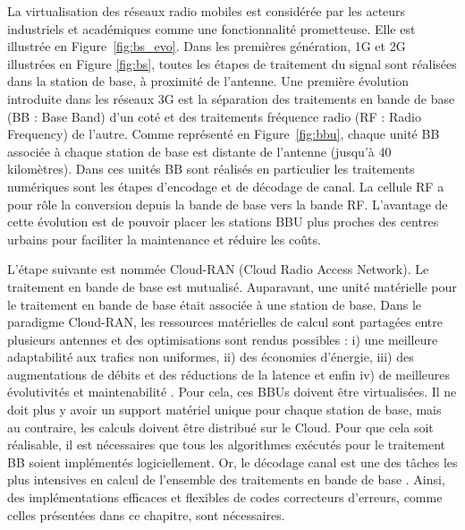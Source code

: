 La virtualisation des réseaux radio mobiles est considérée par les acteurs industriels \cite{ericsson_cloud_2015,huawei_5g:_2013} et académiques \cite{wubben_benefits_2014,rost_cloud_2014,checko_cloud_2015} comme une fonctionnalité prometteuse. Elle est illustrée en Figure~\ref{fig:bs_evo}. Dans les premières génération, 1G et 2G illustrées en Figure \ref{fig:bs}, toutes les étapes de traitement du signal sont réalisées dans la station de base, à proximité de l'antenne. Une première évolution introduite dans les réseaux 3G est la séparation des traitements en bande de base (BB : Base Band) d'un coté et des traitements fréquence radio (RF : Radio Frequency) de l'autre. Comme représenté en Figure~\ref{fig:bbu}, chaque unité BB associée à chaque station de base est distante de l'antenne (jusqu'à 40 kilomètres). Dans ces unités BB sont réalisés en particulier les traitements numériques sont les étapes d'encodage et de décodage de canal. La cellule RF a pour rôle la conversion depuis la bande de base vers la bande RF. L'avantage de cette évolution est de pouvoir placer les stations BBU plus proches des centres urbains pour faciliter la maintenance et réduire les coûts.

L'étape suivante est nommée Cloud-RAN (Cloud Radio Access Network). Le traitement en bande de base est mutualisé. Auparavant, une unité matérielle pour le traitement en bande de base était associée à une station de base. Dans le paradigme Cloud-RAN, les ressources matérielles de calcul sont partagées entre plusieurs antennes et des optimisations sont rendus possibles : i) une meilleure adaptabilité aux trafics non uniformes, ii) des économies d'énergie, iii) des augmentations de débits et des réductions de la latence et enfin iv) de meilleures évolutivités et maintenabilité \cite{checko_cloud_2015}. Pour cela, ces BBUs doivent être virtualisées. Il ne doit plus y avoir un support matériel unique pour chaque station de base, mais au contraire, les calculs doivent être distribué sur le Cloud. Pour que cela soit réalisable, il est nécessaires que tous les algorithmes exécutés pour le traitement BB soient implémentés logiciellement. Or, le décodage canal est une des tâches les plus intensives en calcul de l'ensemble des traitements en bande de base \cite{rodriguez_towards_2017,nikaein_processing_2015}. Ainsi, des implémentations efficaces et flexibles de codes correcteurs d'erreurs, comme celles présentées dans ce chapitre, sont nécessaires.

